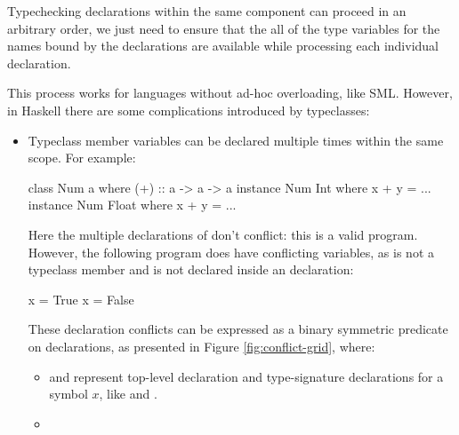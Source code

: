 \documentclass[dissertation.tex]{subfiles}
\begin{document}
{{{            Typechecking declarations within the same component can proceed in an arbitrary order, we just need to
            ensure that the all of the type variables for the names bound by the declarations are available while
            processing each individual declaration.

            This process works for languages without ad-hoc overloading, like SML. However, in Haskell there are some
            complications introduced by typeclasses:

            \begin{itemize}
            \item
            {
                Typeclass member variables can be declared multiple times within the same scope. For example:
                
                \begin{haskellfigure}
                class Num a where
                    (+) :: a -> a -> a
                instance Num Int where
                    x + y = ...
                instance Num Float where
                    x + y = ...
                \end{haskellfigure}

                Here the multiple declarations of \haskell{+} don't conflict: this is a valid program. However, the
                following program does have conflicting variables, as  is not a typeclass member and is not
                declared inside an  declaration:

                \begin{haskellfigure}
                x = True
                x = False
                \end{haskellfigure}

                These declaration conflicts can be expressed as a binary symmetric predicate on declarations, as
                presented in Figure \ref{fig:conflict-grid}, where:

                \begin{itemize}
                \item
                {

                     and  represent top-level declaration and
                    type-signature declarations for a symbol \(x\), like  and .

                }
                \item
                {
                    
}
\end{itemize}}
\end{itemize}}}}
\end{document}
